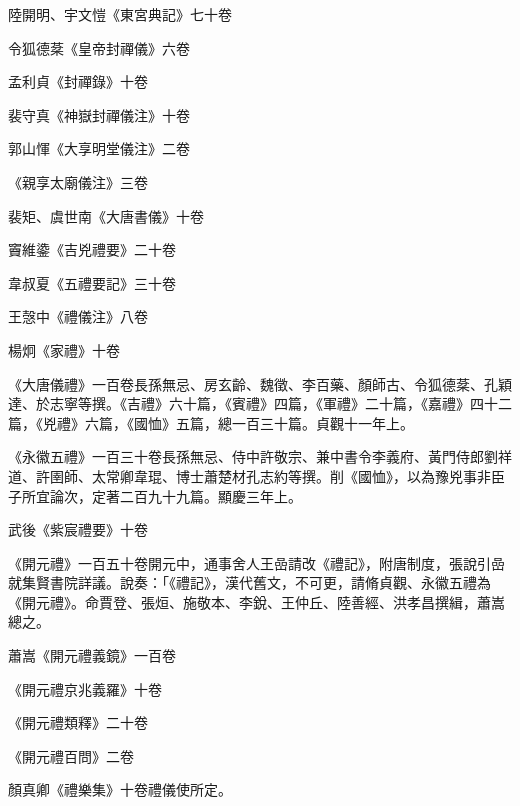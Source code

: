 \begin{pinyinscope}
 陸開明、宇文愷《東宮典記》七十卷



 令狐德棻《皇帝封禪儀》六卷



 孟利貞《封禪錄》十卷



 裴守真《神嶽封禪儀注》十卷



 郭山惲《大享明堂儀注》二卷



 《親享太廟儀注》三卷



 裴矩、虞世南《大唐書儀》十卷



 竇維鍌《吉兇禮要》二十卷



 韋叔夏《五禮要記》三十卷



 王愨中《禮儀注》八卷



 楊炯《家禮》十卷



 《大唐儀禮》一百卷長孫無忌、房玄齡、魏徵、李百藥、顏師古、令狐德棻、孔穎達、於志寧等撰。《吉禮》六十篇，《賓禮》四篇，《軍禮》二十篇，《嘉禮》四十二篇，《兇禮》六篇，《國恤》五篇，總一百三十篇。貞觀十一年上。



 《永徽五禮》一百三十卷長孫無忌、侍中許敬宗、兼中書令李義府、黃門侍郎劉祥道、許圉師、太常卿韋琨、博士蕭楚材孔志約等撰。削《國恤》，以為豫兇事非臣子所宜論次，定著二百九十九篇。顯慶三年上。



 武後《紫宸禮要》十卷



 《開元禮》一百五十卷開元中，通事舍人王嵒請改《禮記》，附唐制度，張說引嵒就集賢書院詳議。說奏：「《禮記》，漢代舊文，不可更，請脩貞觀、永徽五禮為《開元禮》。命賈登、張烜、施敬本、李銳、王仲丘、陸善經、洪孝昌撰緝，蕭嵩總之。



 蕭嵩《開元禮義鏡》一百卷



 《開元禮京兆義羅》十卷



 《開元禮類釋》二十卷



 《開元禮百問》二卷



 顏真卿《禮樂集》十卷禮儀使所定。




\end{pinyinscope}
